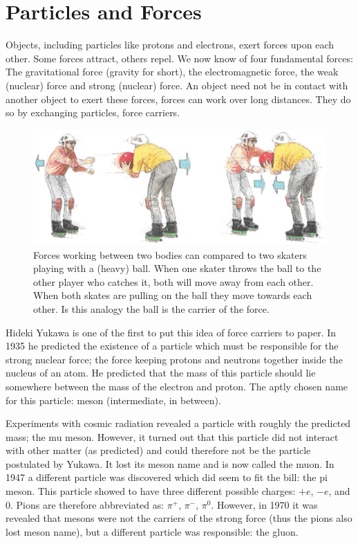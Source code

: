 \documentclass[12pt,a4paper]{article}
\numberwithin{equation}{section}
\numberwithin{figure}{section}
\numberwithin{table}{section}
\begin{document}
\section{Particles and Forces}
Objects, including particles like protons and electrons, exert forces upon each other. Some forces attract, others repel. We now know of four fundamental forces: The gravitational force (gravity for short), the electromagnetic force, the weak (nuclear) force and strong (nuclear) force. An object need not be in contact with another object to exert these forces, forces can work over long distances. They do so by exchanging particles, force carriers.

\begin{figure}\begin{center}
\includegraphics[scale=0.5]{force_particles.eps}%
\caption{Forces working between two bodies can compared to two skaters playing with a (heavy) ball. When one skater throws the ball to the other player who catches it, both will move away from each other. When both skates are pulling on the ball they move towards each other. Is this analogy the ball is the carrier of the force.}\label{fig:force_particles}
\end{center}\end{figure}

Hideki Yukawa is one of the first to put this idea of force carriers to paper. In 1935 he predicted the existence of a particle which must be responsible for the strong nuclear force; the force keeping protons and neutrons together inside the nucleus of an atom. He predicted that the mass of this particle should lie somewhere between the mass of the electron and proton. The aptly chosen name for this particle: meson (intermediate, in between).

Experiments with cosmic radiation revealed a particle with roughly the predicted mass; the mu meson. However, it turned out that this particle did not interact with other matter (as predicted) and could therefore not be the particle postulated by Yukawa. It lost its meson name and is now called the muon. In 1947 a different particle was discovered which did seem to fit the bill: the pi meson. This particle showed to have three different possible charges: $+e$, $-e$, and $0$. Pions are therefore abbreviated as: $\pi^+$, $\pi^-$, $\pi^0$. However, in 1970 it was revealed that mesons were not the carriers of the strong force (thus the pions also lost meson name), but a different particle was responsible: the gluon.
\end{document}
